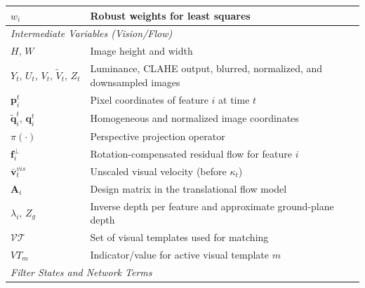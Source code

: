{\begin{longtable}{p{}p{}}
            $w_i$                                                       & Robust weights for least squares                                     \\
            \midrule
            \multicolumn{2}{l}{\textit{Intermediate Variables (Vision/Flow)}}                                                                  \\
            $H,\,W$                                                     & Image height and width                                               \\
            $Y_t,\,U_t,\,V_t,\,\tilde V_t,\,Z_t$                        & Luminance, CLAHE output, blurred, normalized, and downsampled images \\
            $\mathbf{p}_i^t$                                            & Pixel coordinates of feature $i$ at time $t$                         \\
            $\tilde{\mathbf{q}}_i^t,\,\mathbf{q}_i^t$                   & Homogeneous and normalized image coordinates                         \\
            $\pi(\cdot)$                                                & Perspective projection operator                                      \\
            $\mathbf{f}_i^{\perp}$                                      & Rotation-compensated residual flow for feature $i$                   \\
            $\bar{\mathbf{v}}^{vis}_t$                                  & Unscaled visual velocity (before $\kappa_t$)                         \\
            $\mathbf{A}_i$                                              & Design matrix in the translational flow model                        \\
            $\lambda_i,\,Z_g$                                           & Inverse depth per feature and approximate ground-plane depth         \\
            $\mathcal{VT}$                                              & Set of visual templates used for matching                            \\
            $VT_m$                                                      & Indicator/value for active visual template $m$                       \\
            \midrule
            \multicolumn{2}{l}{\textit{Filter States and Network Terms}}                                                                       \\

\end{longtable}}
